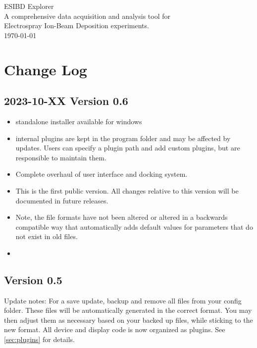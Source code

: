 \documentclass[a4paper,11pt,DIV=13]{scrartcl}
\newif\ifverboose
\begin{document}
\begin{centering}
{\LARGE ESIBD Explorer}\\
\vspace{.5cm}
{\Large A comprehensive data acquisition and analysis tool for \\ Electrospray Ion-Beam Deposition experiments.} \\
\vspace{.5cm}
{\today}\\
\end{centering}

\tableofcontents

\section{Change Log}

\subsection{2023-10-XX Version 0.6}
\begin{itemize}
\item standalone installer available for windows
\item internal plugins are kept in the program folder and may be affected by updates. Users can specify a plugin path and add custom plugins, but are responsible to maintain them.
\item Complete overhaul of user interface and docking system.
\item This is the first public version. All changes relative to this version will be documented in future releases.
\item Note, the file formats have not been altered or altered in a backwards compatible way that automatically adds default values for parameters that do not exist in old files.
\item 
\end{itemize}


\subsection{Version 0.5}
Update notes: For a save update, backup and remove all files from your config folder. These files will be automatically generated in the correct format. You may then adjust them as necessary based on your backed up files, while sticking to the new format.
All device and display code is now organized as plugins. See \ref{sec:plugins} for details.
\end{document}
